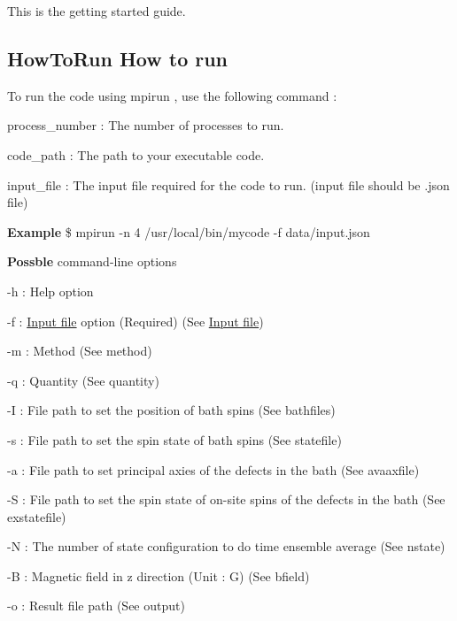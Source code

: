 This is the getting started guide.

\subsection*{How\-To\-Run How to run}

To run the code using {\ttfamily  mpirun }, use the following command \-:





\begin{DoxyItemize}
\item process\-\_\-number \-: The number of processes to run.
\item code\-\_\-path \-: The path to your executable code.
\item input\-\_\-file \-: The input file required for the code to run. (input file should be {\ttfamily .json} file)
\end{DoxyItemize}

{\bfseries Example} {\bfseries }  \$ mpirun -\/n 4 /usr/local/bin/mycode -\/f data/input.\-json 

{\bfseries Possble} command-\/line options {\bfseries } 


\begin{DoxyItemize}
\item -\/h \-: Help option
\item -\/f \-: \hyperlink{InputFile}{Input file} option (Required) (See \hyperlink{InputFile}{Input file})
\item -\/m \-: Method (See method)
\item -\/q \-: Quantity (See quantity)
\item -\/\-I \-: File path to set the position of bath spins (See bathfiles)
\item -\/s \-: File path to set the spin state of bath spins (See statefile)
\item -\/a \-: File path to set principal axies of the defects in the bath (See avaaxfile)
\item -\/\-S \-: File path to set the spin state of on-\/site spins of the defects in the bath (See exstatefile) 
\item -\/\-N \-: The number of state configuration to do time ensemble average (See nstate)
\item -\/\-B \-: Magnetic field in z direction (Unit \-: G) (See bfield)
\item -\/o \-: Result file path (See output)
\end{DoxyItemize}

